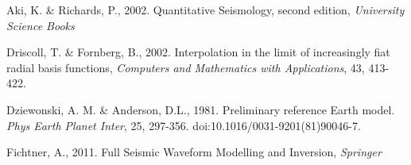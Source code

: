 \documentclass[12pt]{article}
\begin{document}
\begin{thebibliography}{}
   Aki, K. \& Richards, P.,
    2002. Quantitative Seismology, second edition, \textit{University
      Science Books}


   Driscoll, T. \& Fornberg, B.,
    2002. Interpolation in the limit of increasingly fiat radial basis
    functions, \textit{Computers and Mathematics with Applications},
    43, 413-422.

   Dziewonski, A. M. \&
    Anderson, D.L., 1981. Preliminary reference Earth
    model. \textit{Phys Earth Planet Inter}, 25,
    297-356. doi:10.1016/0031-9201(81)90046-7.

   Fichtner, A., 2011. Full Seismic
    Waveform Modelling and Inversion, \textit{Springer}
\end{thebibliography}
\end{document}
